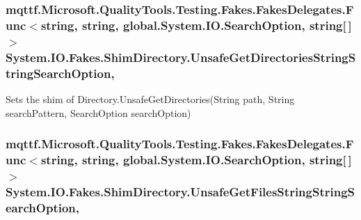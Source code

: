 \hypertarget{class_system_1_1_i_o_1_1_fakes_1_1_shim_directory_a0d8127ac0e57913979162611cc01fdb1}{
\subsubsection[{Unsafe\-Get\-Directories\-String\-String\-Search\-Option}]{\setlength{\rightskip}{0pt plus 5cm}mqttf.\-Microsoft.\-Quality\-Tools.\-Testing.\-Fakes.\-Fakes\-Delegates.\-Func$<$string, string, global.\-System.\-I\-O.\-Search\-Option, string\mbox{[}$\,$\mbox{]}$>$ System.\-I\-O.\-Fakes.\-Shim\-Directory.\-Unsafe\-Get\-Directories\-String\-String\-Search\-Option\hspace{0.3cm}{\ttfamily [static]}, {\ttfamily [set]}}}\label{class_system_1_1_i_o_1_1_fakes_1_1_shim_directory_a0d8127ac0e57913979162611cc01fdb1}


Sets the shim of Directory.\-Unsafe\-Get\-Directories(\-String path, String search\-Pattern, Search\-Option search\-Option)

\hypertarget{class_system_1_1_i_o_1_1_fakes_1_1_shim_directory_ac72f99116d232a6220778e34376886ce}{
\subsubsection[{Unsafe\-Get\-Files\-String\-String\-Search\-Option}]{\setlength{\rightskip}{0pt plus 5cm}mqttf.\-Microsoft.\-Quality\-Tools.\-Testing.\-Fakes.\-Fakes\-Delegates.\-Func$<$string, string, global.\-System.\-I\-O.\-Search\-Option, string\mbox{[}$\,$\mbox{]}$>$ System.\-I\-O.\-Fakes.\-Shim\-Directory.\-Unsafe\-Get\-Files\-String\-String\-Search\-Option\hspace{0.3cm}{\ttfamily [static]}, {\ttfamily [set]}}}\label{class_system_1_1_i_o_1_1_fakes_1_1_shim_directory_ac72f99116d232a6220778e34376886ce}


